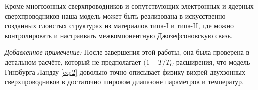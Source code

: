 Кроме многозонных сверхпроводников и сопутствующих электронных и ядерных 
сверхпроводников наша модель может быть реализована в искусственно созданных 
слоистых структурах из материалов типа-I и типа-II, где можно контролировать 
и настраивать межкомпонентную Джозефсоновскую связь.

\emph{Добавленное примечение:} После завершения этой работы, она была проверена в 
детальном расчёте, который не предполагает \( (1-T/T_C \) расширения, что 
модель Гинзбурга-Ландау \eqref{eq:2} довольно точно описывает физику вихрей 
двухзонных сверхпроводников в достаточно широком диапазоне параметров и 
температур\cite{bib:25}.
